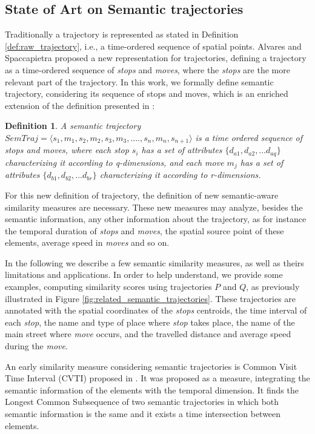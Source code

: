 \documentclass[12pt]{article}
\newtheorem{definition}{Definition}
\begin{document}
\subsection{State of Art on Semantic trajectories} \label{sec:related_semantic}
Traditionally a trajectory is represented as stated in Definition \ref{def:raw_trajectory}, i.e., a time-ordered sequence of spatial points. Alvares \cite{alvares2007model} and Spaccapietra \cite{Spaccapietra:2008:CVT:1347466.1347785} proposed a new representation for trajectories, defining a trajectory as a time-ordered sequence of \emph{stops} and \emph{moves}, where the \emph{stops} are the more relevant part of the trajectory.
In this work, we formally define semantic trajectory, considering its sequence of stops and moves, which is an enriched extension of the definition presented in \cite{Spaccapietra:2008:CVT:1347466.1347785}:

\begin{definition}
\label{def:semantic_trajectory}
A semantic trajectory  $SemTraj=\langle s_1, m_1, s_2, m_2, s_3,m_3, ...., s_n, m_n, s_{n+1} \rangle$ is a time ordered sequence of stops and moves, where each stop $s_i$ has a set of attributes $\{d_{a1}, d_{a2}, ...d_{aq}\}$ characterizing it according to q-dimensions, and each move $m_j$  has a set of attributes $\{d_{b1}, d_{b2}, ...d_{br}\}$  characterizing it according to r-dimensions. 
\end{definition}    

For this new definition of trajectory, the definition of new semantic-aware similarity measures are necessary. These new measures may analyze, besides the semantic information, any other information about the trajectory, as for instance the temporal duration of \emph{stops} and \emph{moves}, the spatial source point of these elements, average speed in \emph{moves} and so on.

In the following we describe a few semantic similarity measures, as well as theirs limitations and applications. In order to help understand, we provide some examples, computing similarity scores using trajectories $P$ and $Q$, as previously illustrated in Figure \ref{fig:related_semantic_trajectories}. These trajectories are annotated with the spatial coordinates of the \emph{stops} centroids, the time interval of each \emph{stop}, the name and type of place where \emph{stop} takes place, the name of the main street where \emph{move} occurs, and the travelled distance and average speed during the \emph{move}.

An early similarity measure considering semantic trajectories is Common Visit Time Interval (CVTI) proposed in \cite{Kang:2009:SMT:1529282.1529580}. It was proposed as a measure, integrating the semantic information of the elements with the temporal dimension. It finds the Longest Common Subsequence of two semantic trajectories in which both semantic information is the same and it exists a time intersection between elements. 
\end{document}
